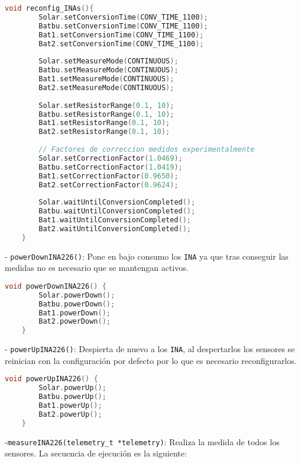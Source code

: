 \begin{lstlisting}[captionpos=b, caption={Codigo funcion reconfig\_INAs}, language=c++]
    void reconfig_INAs(){
        Solar.setConversionTime(CONV_TIME_1100);
        Batbu.setConversionTime(CONV_TIME_1100);
        Bat1.setConversionTime(CONV_TIME_1100);
        Bat2.setConversionTime(CONV_TIME_1100);
    
        Solar.setMeasureMode(CONTINUOUS);
        Batbu.setMeasureMode(CONTINUOUS);
        Bat1.setMeasureMode(CONTINUOUS);
        Bat2.setMeasureMode(CONTINUOUS);
        
        Solar.setResistorRange(0.1, 10);
        Batbu.setResistorRange(0.1, 10);
        Bat1.setResistorRange(0.1, 10);
        Bat2.setResistorRange(0.1, 10);
        
        // Factores de correccion medidos experimentalmente
        Solar.setCorrectionFactor(1.0469);
        Batbu.setCorrectionFactor(1.0419);
        Bat1.setCorrectionFactor(0.9650);
        Bat2.setCorrectionFactor(0.9624);
        
        Solar.waitUntilConversionCompleted();
        Batbu.waitUntilConversionCompleted();
        Bat1.waitUntilConversionCompleted();
        Bat2.waitUntilConversionCompleted();
    }
\end{lstlisting}

- \texttt{powerDownINA226()}: Pone en bajo consumo los \texttt{INA} ya que tras conseguir las medidas no es necesario que se mantengan activos.

\begin{lstlisting}[captionpos=b, caption={Codigo funcion powerDownINA226}, language=c++]
    void powerDownINA226() {
        Solar.powerDown();
        Batbu.powerDown();
        Bat1.powerDown();
        Bat2.powerDown();
    }
\end{lstlisting}


- \texttt{powerUpINA226()}: Despierta de nuevo a los \texttt{INA}, al despertarlos los sensores se reinician con la configuración por defecto por lo que es necesario reconfigurarlos.

\begin{lstlisting}[captionpos=b, caption={Codigo funcion powerUpINA226}, language=c++]
    void powerUpINA226() {
        Solar.powerUp();
        Batbu.powerUp();
        Bat1.powerUp();
        Bat2.powerUp();
    }
\end{lstlisting}

-\texttt{measureINA226(telemetry\_t *telemetry)}: Realiza la medida de todos los sensores. La secuencia de ejecución es la siguiente:

